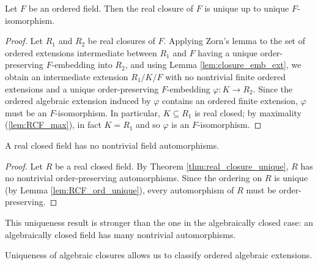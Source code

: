 \begin{theorem}
  \label{thm:real_closure_unique}
  Let $F$ be an ordered field. Then the real closure of $F$ is unique up to unique $F$-isomorphism.
\end{theorem}
\begin{proof}
  Let $R_1$ and $R_2$ be real closures of $F$. Applying Zorn's lemma to the set of ordered extensions intermediate between $R_1$ and $F$ having a unique order-preserving $F$-embedding into $R_2$, and using Lemma \ref{lem:closure_emb_ext}, we obtain an intermediate extension $R_1/K/F$ with no nontrivial finite ordered extensions and a unique order-preserving $F$-embedding $\varphi:K\to R_2$. Since the ordered algebraic extension induced by $\varphi$ contains an ordered finite extension, $\varphi$ must be an $F$-isomorphism. In particular, $K\subseteq R_1$ is real closed; by maximality (\ref{lem:RCF_max}), in fact $K=R_1$ and so $\varphi$ is an $F$-isomorphism.
\end{proof}

\begin{corollary}
  \label{cor:RCF_no_auto}
  A real closed field has no nontrivial field automorphisms.
\end{corollary}
\begin{proof}
  Let $R$ be a real closed field. By Theorem \ref{thm:real_closure_unique}, $R$ has no nontrivial order-preserving automorphisms. Since the ordering on $R$ is unique (by Lemma \ref{lem:RCF_ord_unique}), every automorphism of $R$ must be order-preserving.
\end{proof}

This uniqueness result is stronger than the one in the algebraically closed case: an algebraically closed field has many nontrivial automorphisms.

Uniqueness of algebraic closures allows us to classify ordered algebraic extensions.

